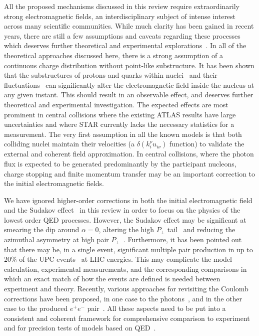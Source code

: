 \documentclass[12pt,epjc3]{svjour3}\sloppy
\begin{document}
All the proposed mechanisms discussed in this review require extraordinarily strong electromagnetic fields, an interdisciplinary subject of intense interest across many scientific communities. While much clarity has been gained in recent years, there are still a few assumptions and caveats regarding these processes which deserves further theoretical and experimental explorations~\cite{zhaInitialTransversemomentumBroadening2020b}.  In all of the theoretical approaches discussed here, there is a strong assumption of a continuous charge distribution without point-like substructure. It has been shown that the substructures of protons and quarks within nuclei~\cite{Staig:2010by} and their fluctuations~\cite{Bzdak:2011yy} can significantly alter the electromagnetic field inside the nucleus at any given instant. This should result in an observable effect, and deserves further theoretical and experimental investigation. The expected effects are most prominent in central collisions where the existing ATLAS results have large uncertainties and where STAR currently lacks the necessary statistics for a measurement. 
The very first assumption in all the known models is that both colliding nuclei maintain their velocities (a $\delta(k_{i}^{\nu}u_{i\nu})$ function) to validate the external and coherent field approximation. In central collisions, where the photon flux is expected to be generated predominantly by the participant nucleons, charge stopping and finite momentum transfer may be an important correction to the initial electromagnetic fields. 

We have ignored higher-order corrections in both the initial electromagnetic field~\cite{PhysRevC.70.031902} and the Sudakov effect~\cite{Klein:2018fmp} in this review in order to focus on the physics of the lowest order QED processes. However, the Sudakov effect may be significant at smearing the dip around $\alpha=0$, altering the high $P_{\perp}$ tail~\cite{Klein:2018fmp} and reducing the azimuthal asymmetry at high pair $P_{\perp}$~\cite{liImpactParameterDependence2020}. Furthermore, it has been pointed out that there may be, in a single event, significant multiple pair production in up to 20\% of the UPC events~\cite{Hencken:2004td} at LHC energies. This may complicate the model calculation, experimental measurements, and the corresponding comparisons in which an exact match of how the events are defined is needed between experiment and theory. Recently, various approaches for revisiting the Coulomb corrections have been proposed, in one case to the photons~\cite{Zha:2021jhf}, and in the other case to the produced $e^+e^-$ pair~\cite{Sun:2020ygb}. All these aspects need to be put into a consistent and coherent framework for comprehensive comparison to experiment and for precision tests of models based on QED~\cite{klusek-gawendaCentralityDependenceDilepton2021,Wang:2021kxm}.
\end{document}
